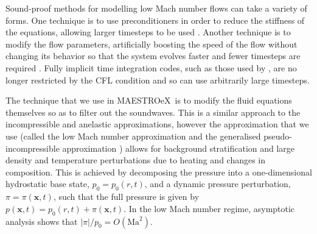 \documentclass[a4paper]{jpconf}
\newcommand{\maestroex}{{\sffamily MAESTROeX}}
\begin{document}
Sound-proof methods for modelling low Mach number flows can take a variety of forms. One technique is to use preconditioners in order to reduce the stiffness of the equations, allowing larger timesteps to be used \cite{Miczek2014,Barsukow2016}. Another technique is to modify the flow parameters, artificially boosting the speed of the flow without changing its behavior so that the system evolves faster and fewer timesteps are required \citep{Rempel2005,Hotta2012}. Fully implicit time integration codes, such as those used by \cite{Viallet2011,Viallet2015,Goffrey2016}, are no longer restricted by the CFL condition and so can use arbitrarily large timesteps.

The technique that we use in \maestroex~is to modify the fluid equations themselves so as to filter out the soundwaves. This is a similar approach to the incompressible \cite{Boussinesq1901} and anelastic \cite{Ogura1962a,Gough1968,Durran1989} approximations, however the approximation that we use (called the low Mach number approximation \cite{Day2000,Almgren2006a,Nonaka2010} and the generalised pseudo-incompressible approximation \cite{Vasil2013}) allows for background stratification and large density and temperature perturbations due to heating and changes in composition. This is achieved by decomposing the pressure into a one-dimensional hydrostatic base state, $p_0 = p_0(r, t)$, and a dynamic pressure perturbation, $\pi = \pi(\bm{x}, t)$, such that the full pressure is given by $p(\bm{x}, t) = p_0(r, t) + \pi(\bm{x}, t)$. In the low Mach number regime, asymptotic analysis shows that $|\pi|/p_0 = O(\mathrm{Ma}^2)$. 
\end{document}

